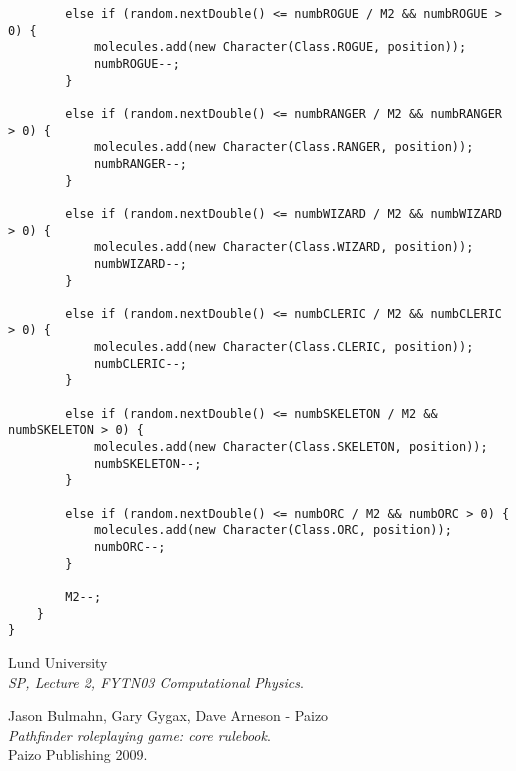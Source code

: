 \documentclass[a4paper,12pt]{article}
\begin{document}
\begin{lstlisting}
		else if (random.nextDouble() <= numbROGUE / M2 && numbROGUE > 0) {
			molecules.add(new Character(Class.ROGUE, position));
			numbROGUE--;
		}

		else if (random.nextDouble() <= numbRANGER / M2 && numbRANGER > 0) {
			molecules.add(new Character(Class.RANGER, position));
			numbRANGER--;
		}

		else if (random.nextDouble() <= numbWIZARD / M2 && numbWIZARD > 0) {
			molecules.add(new Character(Class.WIZARD, position));
			numbWIZARD--;
		}

		else if (random.nextDouble() <= numbCLERIC / M2 && numbCLERIC > 0) {
			molecules.add(new Character(Class.CLERIC, position));
			numbCLERIC--;
		}

		else if (random.nextDouble() <= numbSKELETON / M2 && numbSKELETON > 0) {
			molecules.add(new Character(Class.SKELETON, position));
			numbSKELETON--;
		}

		else if (random.nextDouble() <= numbORC / M2 && numbORC > 0) {
			molecules.add(new Character(Class.ORC, position));
			numbORC--;
		}

		M2--;
	}
}
\end{lstlisting}

\begin{thebibliography}{99}
  Lund University\\
  \emph{SP, Lecture 2, FYTN03 Computational Physics}.
  
  Jason Bulmahn, Gary Gygax, Dave Arneson - Paizo \\
  \emph{Pathfinder roleplaying game: core rulebook}.\\
  Paizo Publishing 2009.

\end{thebibliography}
\end{document}
